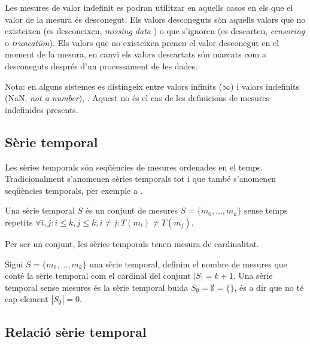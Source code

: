Les mesures de valor indefinit es podran utilitzar en aquells casos en
els que el valor de la mesura és desconegut. Els valors desconeguts
són aquells valors que no existeixen (es desconeixen, \emph{missing
  data} ) o que s'ignoren (es descarten, \emph{censoring} o
\emph{truncation}). Els valors que no existeixen prenen el valor
desconegut en el moment de la mesura, en canvi els valors descartats
són marcats com a desconeguts després d'un processament de les dades.

Nota: en alguns sistemes es distingeix entre valors infinits
($\infty$) i valors indefinits (NaN, \emph{not a number}),
\cite{wiki:ieee754}. Aquest no és el cas de les definicions de mesures
indefinides presents.







\subsection{Sèrie temporal}
\label{sec:model:serietemporal}

Les sèries temporals són seqüències de mesures ordenades en el temps.
Tradicionalment s'anomenen sèries temporals tot i que també s'anomenen
seqüències temporals, per exemple a \cite{last:hetland}. 

\begin{definition}
  \label{def:serie_temporal}
  Una sèrie temporal $S$ és un conjunt de mesures
  $S=\{m_0,\ldots,m_k\}$ sense temps repetits
  $\forall i,j: i\leq k, j\leq k, i\neq j : T(m_i)\neq T(m_j)$.
\end{definition}

Per ser un conjunt, les sèries temporals tenen mesura de cardinalitat.
\begin{definition}[Cardinal]
  Sigui $S=\{m_0,\ldots,m_k\}$ una sèrie temporal, definim el nombre
  de mesures que conté la sèrie temporal com el cardinal del conjunt
  $|S|=k+1$. Una sèrie temporal sense mesures és la sèrie temporal
  buida $S_\emptyset= \emptyset = \{\}$, és a dir que no té cap element
  $|S_\emptyset|=0$.
\end{definition}


 




\subsection{Relació sèrie temporal}

